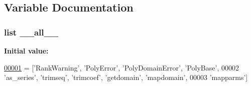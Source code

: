 \subsection{Variable Documentation}
\hypertarget{namespacepyneb_1_1utils_1_1polyutils_aa4a022e6ddacd362b83964da5cc5d044}{
\subsubsection[{\-\_\-\-\_\-all\-\_\-\-\_\-}]{\setlength{\rightskip}{0pt plus 5cm}list \-\_\-\-\_\-all\-\_\-\-\_\-}}\label{namespacepyneb_1_1utils_1_1polyutils_aa4a022e6ddacd362b83964da5cc5d044}
{\bfseries Initial value\-:}
\begin{DoxyCode}
\hypertarget{namespacepyneb_1_1utils_1_1polyutils_l00001}{}\hyperlink{namespacepyneb_1_1utils_1_1polyutils}{00001} = [\textcolor{stringliteral}{'RankWarning'}, \textcolor{stringliteral}{'PolyError'}, \textcolor{stringliteral}{'PolyDomainError'}, \textcolor{stringliteral}{'PolyBase'},
00002            \textcolor{stringliteral}{'as\_series'}, \textcolor{stringliteral}{'trimseq'}, \textcolor{stringliteral}{'trimcoef'}, \textcolor{stringliteral}{'getdomain'}, \textcolor{stringliteral}{'mapdomain'},
00003            \textcolor{stringliteral}{'mapparms'}]
\end{DoxyCode}
